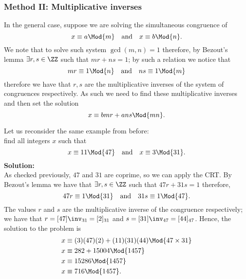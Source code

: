\documentclass[12pt, a4paper]{article}
\begin{document}


\subsubsection{Method II: Multiplicative inverses}

In the general case, suppose we are solving the simultaneous congruence of 
\[
    x \equiv a \Mod{m} \quad \text{and} \quad x\equiv b \Mod{n}.
\]
We note that to solve such system \(\gcd(m,n)=1\) therefore, by Bezout's lemma \(\exists r,s \in \ZZ\) such that \(mr+ns =1\); by such a relation we notice that 
\[
    mr \equiv 1 \Mod{n} \quad \text{and} \quad ns \equiv 1 \Mod{m}
\]
therefore we have that \(r,s\) are the multiplicative inverses of the system of congruences respectively. As such we need to find these multiplicative inverses and then set the solution 
\[
    x\equiv bmr + ans \Mod{mn}.
\]

\begin{example}
    Let us reconsider the same example from before: \\
    find all integers \(x\) such that
    \[x \equiv 11 \Mod{47} \quad \text{and} \quad x\equiv 3 \Mod{31}.\]
    \textbf{Solution:} \\
    As checked previously, \(47\) and \(31\) are coprime, so we can apply the CRT. By Bezout's lemma we have that \(\exists r,s \in \ZZ\) such that \(47r+31s=1\) therefore,
    \[
        47r \equiv 1 \Mod{31} \quad \text{and} \quad 31s \equiv 1 \Mod{47}.
    \]
    The values \(r\) and \(s\) are the multiplicative inverse of the congruence respectively; we have that \(r = [47]\inv_{31} = [2]_{31}\) and \(s = [31]\inv_{47} = [44]_{47}\). Hence, the solution to the problem is 
    \[\begin{aligned}
        x &\equiv (3)(47)(2) + (11)(31)(44) \Mod{47 \times 31} \\
        x &\equiv 282 + 15004 \Mod{1457} \\
        x &\equiv 15286 \Mod{1457} \\
        x &\equiv 716 \Mod{1457}.
    \end{aligned}\]
\end{example}
\end{document}
